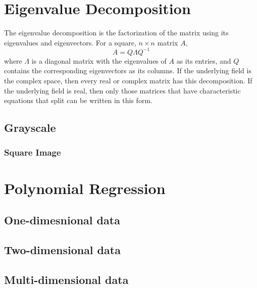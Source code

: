 \documentclass{article}
\begin{document}
\newpage
\section{Eigenvalue Decomposition}

The eigenvalue decomposition is the factorization of the matrix using its eigenvalues and eigenvectors. For a square, $n \times n$ matrix $A$,
$$
A = Q \Lambda Q^{-1}
$$
where $\Lambda$ is a diagonal matrix with the eigenvalues of $A$ as its entries, and $Q$ contains the corresponding eigenvectors as its columns. If the underlying field is the complex space, then every real or complex matrix has this decomposition. If the underlying field is real, then only those matrices that have characteristic equations that split can be written in this form.


\subsection{Grayscale}

\subsubsection{Square Image}


\section{Polynomial Regression}


\subsection{One-dimesnional data}

\subsection{Two-dimensional data}

\subsection{Multi-dimensional data}
\end{document}
